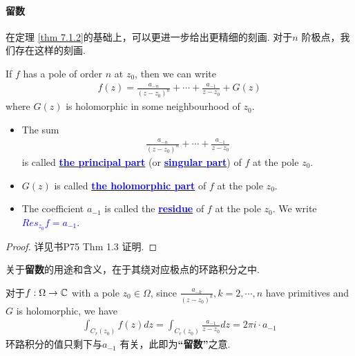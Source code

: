 \newpage
\paragraph{留数}
在定理 \ref{thm 7.1.2}的基础上，可以更进一步给出更精细的刻画. 对于$n$ 阶极点，我们存在这样的刻画.
\begin{thm}\label{thm 7.1.3}
	If $f$ has a pole of order $n$ at $z_0$, then we can write
	\begin{align}
		f(z) = \frac{a_{-n}}{(z - z_0)^n} + \cdots + \frac{a_{-1}}{z - z_0} + G(z)
	\end{align}
	where $G(z)$ is holomorphic in some neighbourhood of $z_0$.
	
	\vspace{1em}
	\begin{rmk}
		\begin{itemize}
			\item The sum
			\begin{align}
				\frac{a_{-n}}{(z - z_0)^n} + \cdots + \frac{a_{-1}}{z - z_0}
			\end{align}
			is called \underline{\textcolor{blue}{\textbf{the principal part}}} (or \underline{\textcolor{blue}{\textbf{singular part}}}) of $f$ at the pole $z_0$.
			
			\vspace{1em}
			
			\item $G(z)$ is called \underline{\textcolor{blue}{\textbf{the holomorphic part}}} of $f$ at the pole $z_0$.
			
			\vspace{1em}
			
			\item The coefficient $a_{-1}$ is called the \underline{\textcolor{blue}{\textbf{residue}}} of $f$ at the pole $z_0$. We write \textcolor{blue}{$Res_{z_0}f = a_{-1}$}.
		\end{itemize}
		
		\vspace{1em}
		\begin{proof}
			详见书P75 Thm 1.3 证明.
		\end{proof}
	\end{rmk}
\end{thm}

\vspace{2em}
关于\textbf{留数}的用途和含义，在于其绕对应极点的环路积分之中. 

对于$f : \Omega \rightarrow \mathbb{C}$ with a pole $z_0 \in \Omega$, since $\frac{a_{-k}}{(z - z_0)^k} , k = 2, \cdots, n$ have primitives and $G$ is holomorphic, we have
\begin{align}
	\int_{C_{r}(z_0)}{f(z) dz} = \int_{C_{r}(z_0)}{\frac{a_{-1}}{z - z_0} dz} = 2\pi i \cdot a_{-1}
\end{align}
环路积分的值只剩下与$a_{-1}$ 有关，此即为\textbf{“留数”}之意.

